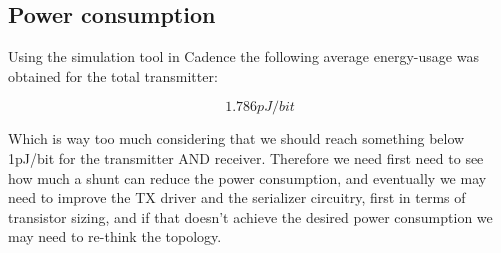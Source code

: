 \subsection{Power consumption}

Using the simulation tool in Cadence the following average energy-usage was obtained for the total transmitter:

$$1.786pJ/bit$$

\noindent Which is way too much considering that we should reach something below 1pJ/bit for the transmitter AND receiver.
Therefore we need first need to see how much a shunt can reduce the power consumption, and eventually we may need to improve the TX driver and the serializer circuitry, first in terms of transistor sizing, and if that doesn't achieve the desired power consumption we may need to re-think the topology.


